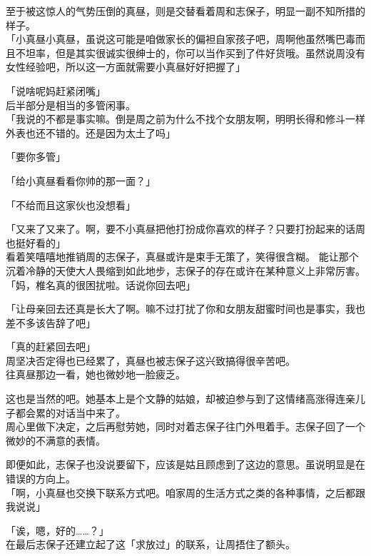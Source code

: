 至于被这惊人的气势压倒的真昼，则是交替看着周和志保子，明显一副不知所措的样子。\\

「小真昼小真昼，虽说这可能是咱做家长的偏袒自家孩子吧，周啊他虽然嘴巴毒而且不坦率，但是其实很诚实很绅士的，你可以当作买到了件好货哦。虽然说周没有女性经验吧，所以这一方面就需要小真昼好好把握了」

「说啥呢妈赶紧闭嘴」\\

后半部分是相当的多管闲事。\\

「我说的不都是事实嘛。倒是周之前为什么不找个女朋友啊，明明长得和修斗一样外表也还不错的。还是因为太土了吗」

「要你多管」

「给小真昼看看你帅的那一面？」

「不给而且这家伙也没想看」

「又来了又来了。啊，要不小真昼把他打扮成你喜欢的样子？只要打扮起来的话周也挺好看的」\\

看着笑嘻嘻地推销周的志保子，真昼或许是束手无策了，笑得很含糊。
能让那个沉着冷静的天使大人畏缩到如此地步，志保子的存在或许在某种意义上非常厉害。\\

「妈，椎名真的很困扰啦。话说你回去吧」

「让母亲回去还真是长大了啊。嘛不过打扰了你和女朋友甜蜜时间也是事实，我也差不多该告辞了吧」

「真的赶紧回去吧」\\

周坚决否定得也已经累了，真昼也被志保子这兴致搞得很辛苦吧。\\

往真昼那边一看，她也微妙地一脸疲乏。

这也是当然的吧。她基本上是个文静的姑娘，却被迫参与到了这情绪高涨得连亲儿子都会累的对话当中来了。\\

周心里做下决定，之后再慰劳她，同时对着志保子往门外甩着手。志保子回了一个微妙的不满意的表情。

即便如此，志保子也没说要留下，应该是姑且顾虑到了这边的意思。虽说明显是在错误的方向上。\\

「啊，小真昼也交换下联系方式吧。咱家周的生活方式之类的各种事情，之后都跟我说说」

「诶，嗯，好的……？」\\

在最后志保子还建立起了这「求放过」的联系，让周捂住了额头。\\

